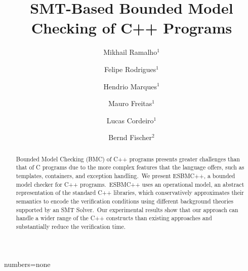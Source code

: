 \documentclass[a4paper]{llncs}
\begin{document}
{numbers=none}
\lstset{language=C,basicstyle=\small}
\lstset{numbers=left, numberstyle=\tiny, stepnumber=1, numbersep=5pt}
\lstset{tabsize=2}
\lstset{firstnumber=1}
\lstset{frame=single}


\title{SMT-Based Bounded Model Checking of C++ Programs}
\author{Mikhail Ramalho$^1$ 	\and
	Felipe Rodrigues$^1$   	\and
	Hendrio Marques$^1$   	\and
	Mauro Freitas$^1$   	\and
	Lucas Cordeiro$^1$   	\and
	Bernd Fischer$^2$}

\maketitle

\begin{abstract}
Bounded Model Checking (BMC) of C++ programs presents greater
challenges than that of C programs due to the more complex
features that the language offers, such as
templates, containers, and exception handling.\
We present ESBMC++, a bounded model checker for C++ programs.\
ESBMC++ uses an operational model, an abstract representation
of the standard C++ libraries, which conservatively
approximates their semantics to encode the verification conditions
using different background theories supported
by an SMT Solver.\  Our experimental results show that
our approach can handle a wider range of the C++
constructs than existing approaches and substantially
reduce the verification time.
\end{abstract}
%
\end{document}
